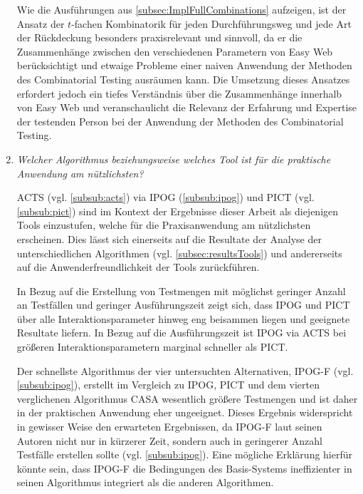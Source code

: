 \begin{enumerate}
Wie die Ausführungen aus \autoref{subsec:ImplFullCombinations} aufzeigen, ist der Ansatz der $t$-fachen Kombinatorik für jeden Durchführungsweg und jede Art der Rückdeckung besonders praxisrelevant und sinnvoll, da er die Zusammenhänge zwischen den verschiedenen Parametern von Easy Web berücksichtigt und etwaige Probleme einer naiven Anwendung der Methoden des Combinatorial Testing ausräumen kann. Die Umsetzung dieses Ansatzes erfordert jedoch ein tiefes Verständnis über die Zusammenhänge innerhalb von Easy Web und veranschaulicht die Relevanz der Erfahrung und Expertise der testenden Person bei der Anwendung der Methoden des Combinatorial Testing.

\item \textit{Welcher Algorithmus beziehungsweise welches Tool ist für die praktische Anwendung am nützlichsten?}

ACTS (vgl. \autoref{subsub:acts}) via IPOG (\autoref{subsub:ipog}) und PICT (vgl. \autoref{subsub:pict}) sind im Kontext der Ergebnisse dieser Arbeit als diejenigen Tools einzustufen, welche für die Praxisanwendung am nützlichsten erscheinen. Dies lässt sich einerseits auf die Resultate der Analyse der unterschiedlichen Algorithmen (vgl. \autoref{subsec:resultsTools}) und andererseits auf die Anwenderfreundlichkeit der Tools zurückführen.

In Bezug auf die Erstellung von Testmengen mit möglichst geringer Anzahl an Testfällen und geringer Ausführungszeit zeigt sich, dass IPOG und PICT über alle Interaktionsparameter hinweg eng beisammen liegen und geeignete Resultate liefern. In Bezug auf die Ausführungszeit ist IPOG via ACTS bei größeren Interaktionsparametern marginal schneller als PICT. 

Der schnellste Algorithmus der vier untersuchten Alternativen, IPOG-F (vgl. \autoref{subsub:ipog}), erstellt im Vergleich zu IPOG, PICT und dem vierten verglichenen Algorithmus CASA wesentlich größere Testmengen und ist daher in der praktischen Anwendung eher ungeeignet. Dieses Ergebnis widerspricht in gewisser Weise den erwarteten Ergebnissen, da IPOG-F laut seinen Autoren nicht nur in kürzerer Zeit, sondern auch in geringerer Anzahl Testfälle erstellen sollte (vgl. \autoref{subsub:ipog}). Eine mögliche Erklärung hierfür könnte sein, dass IPOG-F die Bedingungen des Basis-Systems ineffizienter in seinen Algorithmus integriert als die anderen Algorithmen.


\end{enumerate}
